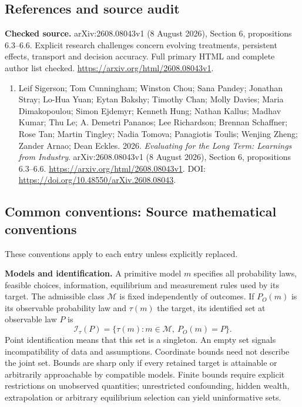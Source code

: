 \documentclass[11pt,a4paper]{article}
\begin{document}
\subsection*{References and source audit}
\textbf{Checked source.} arXiv:2608.08043v1 (8 August 2026), Section 6, propositions 6.3--6.6. Explicit research challenges concern evolving treatments, persistent effects, transport and decision accuracy. Full primary HTML and complete author list checked. \url{https://arxiv.org/html/2608.08043v1}.
\begin{enumerate}\raggedright
\item\hypertarget{definitions:source:30007711:1}{} Leif Sigerson; Tom Cunningham; Winston Chou; Sana Pandey; Jonathan Stray; Lo-Hua Yuan; Eytan Bakshy; Timothy Chan; Molly Davies; Maria Dimakopoulou; Simon Ejdemyr; Kenneth Hung; Nathan Kallus; Madhav Kumar; Thu Le; A. Demetri Pananos; Lee Richardson; Brennan Schaffner; Rose Tan; Martin Tingley; Nadia Tomova; Panagiotis Toulis; Wenjing Zheng; Zander Arnao; Dean Eckles. 2026. \emph{Evaluating for the Long Term: Learnings from Industry}. arXiv:2608.08043v1 (8 August 2026), Section 6, propositions 6.3--6.6.
\url{https://arxiv.org/html/2608.08043v1}.
DOI: \url{https://doi.org/10.48550/arXiv.2608.08043}.
\end{enumerate}

\subsection*{Common conventions: Source mathematical conventions}

These conventions apply to each entry unless explicitly replaced.

\textbf{Models and identification.} A primitive model \(m\) specifies all probability laws, feasible choices, information, equilibrium and measurement rules used by its target. The admissible class \(\mathcal M\) is fixed independently of outcomes. If \(P_O(m)\) is its observable probability law and \(\tau(m)\) the target, its identified set at observable law \(P\) is
\[
 \mathcal I_\tau(P)=\{\tau(m):m\in\mathcal M,\ P_O(m)=P\}.
\]
Point identification means that this set is a singleton. An empty set signals incompatibility of data and assumptions. Coordinate bounds need not describe the joint set. Bounds are sharp only if every retained target is attainable or arbitrarily approachable by compatible models. Finite bounds require explicit restrictions on unobserved quantities; unrestricted confounding, hidden wealth, extrapolation or arbitrary equilibrium selection can yield uninformative sets.
\end{document}
